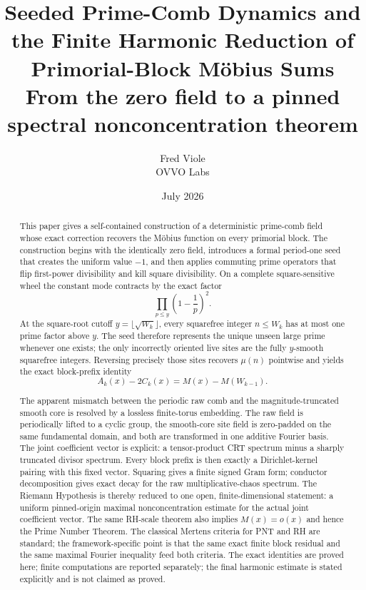 \documentclass[11pt]{article}
\title{\vspace{-1.5em}\textbf{Seeded Prime-Comb Dynamics and the Finite Harmonic Reduction of Primorial-Block M\"obius Sums}\\[0.45em]
\large From the zero field to a pinned spectral nonconcentration theorem}
\author{Fred Viole\\OVVO Labs}
\date{July 2026}
\theoremstyle{definition}
\begin{document}
\maketitle

\begin{abstract}
This paper gives a self-contained construction of a deterministic prime-comb field whose exact correction recovers the M\"obius function on every primorial block.  The construction begins with the identically zero field, introduces a formal period-one seed that creates the uniform value $-1$, and then applies commuting prime operators that flip first-power divisibility and kill square divisibility.  On a complete square-sensitive wheel the constant mode contracts by the exact factor
\[
\prod_{p\le y}\left(1-\frac1p\right)^2.
\]
At the square-root cutoff $y=\lfloor\sqrt{W_k}\rfloor$, every squarefree integer $n\le W_k$ has at most one prime factor above $y$.  The seed therefore represents the unique unseen large prime whenever one exists; the only incorrectly oriented live sites are the fully $y$-smooth squarefree integers.  Reversing precisely those sites recovers $\mu(n)$ pointwise and yields the exact block-prefix identity
\[
A_k(x)-2C_k(x)=M(x)-M(W_{k-1}).
\]

The apparent mismatch between the periodic raw comb and the magnitude-truncated smooth core is resolved by a lossless finite-torus embedding.  The raw field is periodically lifted to a cyclic group, the smooth-core site field is zero-padded on the same fundamental domain, and both are transformed in one additive Fourier basis.  The joint coefficient vector is explicit: a tensor-product CRT spectrum minus a sharply truncated divisor spectrum.  Every block prefix is then exactly a Dirichlet-kernel pairing with this fixed vector.  Squaring gives a finite signed Gram form; conductor decomposition gives exact decay for the raw multiplicative-chaos spectrum.  The Riemann Hypothesis is thereby reduced to one open, finite-dimensional statement: a uniform pinned-origin maximal nonconcentration estimate for the actual joint coefficient vector.  The same RH-scale theorem also implies $M(x)=o(x)$ and hence the Prime Number Theorem.  The classical Mertens criteria for PNT and RH are standard; the framework-specific point is that the same exact finite block residual and the same maximal Fourier inequality feed both criteria.  The exact identities are proved here; finite computations are reported separately; the final harmonic estimate is stated explicitly and is not claimed as proved.
\end{abstract}
\end{document}
